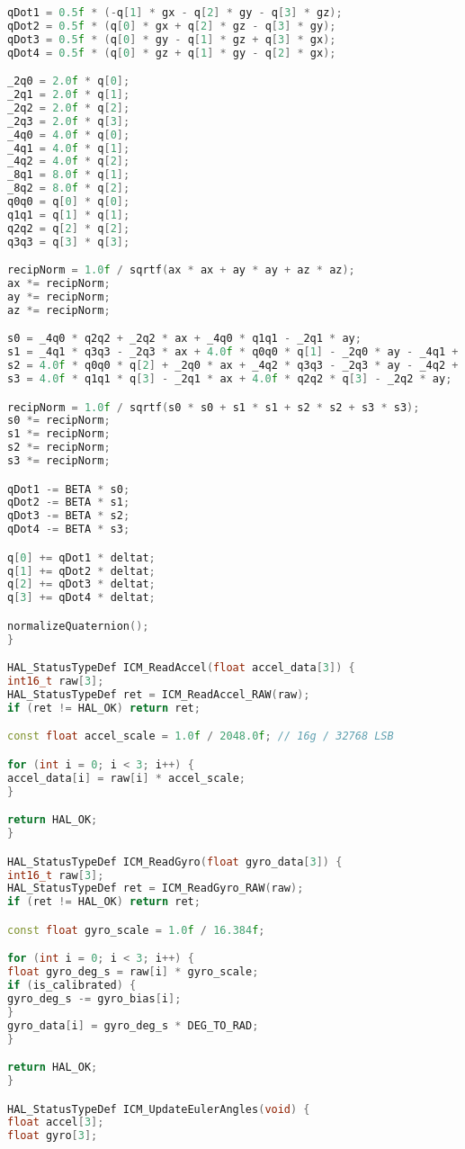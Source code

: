 \begin{lstlisting}[language=C++]
qDot1 = 0.5f * (-q[1] * gx - q[2] * gy - q[3] * gz);
qDot2 = 0.5f * (q[0] * gx + q[2] * gz - q[3] * gy);
qDot3 = 0.5f * (q[0] * gy - q[1] * gz + q[3] * gx);
qDot4 = 0.5f * (q[0] * gz + q[1] * gy - q[2] * gx);

_2q0 = 2.0f * q[0];
_2q1 = 2.0f * q[1];
_2q2 = 2.0f * q[2];
_2q3 = 2.0f * q[3];
_4q0 = 4.0f * q[0];
_4q1 = 4.0f * q[1];
_4q2 = 4.0f * q[2];
_8q1 = 8.0f * q[1];
_8q2 = 8.0f * q[2];
q0q0 = q[0] * q[0];
q1q1 = q[1] * q[1];
q2q2 = q[2] * q[2];
q3q3 = q[3] * q[3];

recipNorm = 1.0f / sqrtf(ax * ax + ay * ay + az * az);
ax *= recipNorm;
ay *= recipNorm;
az *= recipNorm;

s0 = _4q0 * q2q2 + _2q2 * ax + _4q0 * q1q1 - _2q1 * ay;
s1 = _4q1 * q3q3 - _2q3 * ax + 4.0f * q0q0 * q[1] - _2q0 * ay - _4q1 + _8q1 * q1q1 + _8q1 * q2q2 + _4q1 * az;
s2 = 4.0f * q0q0 * q[2] + _2q0 * ax + _4q2 * q3q3 - _2q3 * ay - _4q2 + _8q2 * q1q1 + _8q2 * q2q2 + _4q2 * az;
s3 = 4.0f * q1q1 * q[3] - _2q1 * ax + 4.0f * q2q2 * q[3] - _2q2 * ay;

recipNorm = 1.0f / sqrtf(s0 * s0 + s1 * s1 + s2 * s2 + s3 * s3);
s0 *= recipNorm;
s1 *= recipNorm;
s2 *= recipNorm;
s3 *= recipNorm;

qDot1 -= BETA * s0;
qDot2 -= BETA * s1;
qDot3 -= BETA * s2;
qDot4 -= BETA * s3;

q[0] += qDot1 * deltat;
q[1] += qDot2 * deltat;
q[2] += qDot3 * deltat;
q[3] += qDot4 * deltat;

normalizeQuaternion();
}

HAL_StatusTypeDef ICM_ReadAccel(float accel_data[3]) {
int16_t raw[3];
HAL_StatusTypeDef ret = ICM_ReadAccel_RAW(raw);
if (ret != HAL_OK) return ret;

const float accel_scale = 1.0f / 2048.0f; // 16g / 32768 LSB

for (int i = 0; i < 3; i++) {
accel_data[i] = raw[i] * accel_scale;
}

return HAL_OK;
}

HAL_StatusTypeDef ICM_ReadGyro(float gyro_data[3]) {
int16_t raw[3];
HAL_StatusTypeDef ret = ICM_ReadGyro_RAW(raw);
if (ret != HAL_OK) return ret;

const float gyro_scale = 1.0f / 16.384f;

for (int i = 0; i < 3; i++) {
float gyro_deg_s = raw[i] * gyro_scale;
if (is_calibrated) {
gyro_deg_s -= gyro_bias[i];
}
gyro_data[i] = gyro_deg_s * DEG_TO_RAD;
}

return HAL_OK;
}

HAL_StatusTypeDef ICM_UpdateEulerAngles(void) {
float accel[3];
float gyro[3];


\end{lstlisting}
